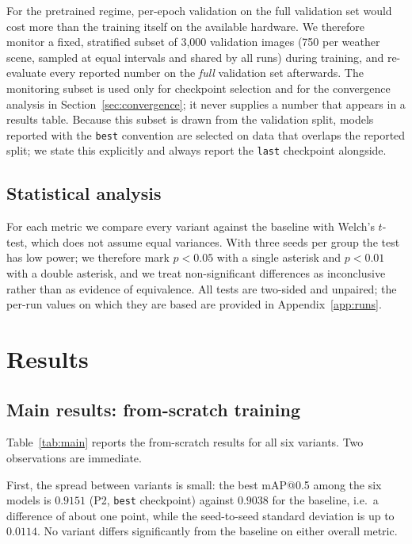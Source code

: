 \documentclass[pdflatex,sn-basic,Numbered]{sn-jnl}%
\begin{document}
For the pretrained regime, per-epoch validation on the full validation set would cost more than the training itself on the available hardware. We therefore monitor a fixed, stratified subset of 3{,}000 validation images (750 per weather scene, sampled at equal intervals and shared by all runs) during training, and re-evaluate every reported number on the \emph{full} validation set afterwards. The monitoring subset is used only for checkpoint selection and for the convergence analysis in Section~\ref{sec:convergence}; it never supplies a number that appears in a results table. Because this subset is drawn from the validation split, models reported with the \texttt{best} convention are selected on data that overlaps the reported split; we state this explicitly and always report the \texttt{last} checkpoint alongside.

\subsection{Statistical analysis}

For each metric we compare every variant against the baseline with Welch's $t$-test, which does not assume equal variances. With three seeds per group the test has low power; we therefore mark $p<0.05$ with a single asterisk and $p<0.01$ with a double asterisk, and we treat non-significant differences as inconclusive rather than as evidence of equivalence. All tests are two-sided and unpaired; the per-run values on which they are based are provided in Appendix~\ref{app:runs}.

\section{Results}\label{sec:results}

\subsection{Main results: from-scratch training}

Table~\ref{tab:main} reports the from-scratch results for all six variants. Two observations are immediate.

First, the spread between variants is small: the best mAP@0.5 among the six models is $0.9151$ (P2, \texttt{best} checkpoint) against $0.9038$ for the baseline, i.e.\ a difference of about one point, while the seed-to-seed standard deviation is up to $0.0114$. No variant differs significantly from the baseline on either overall metric.
\end{document}
